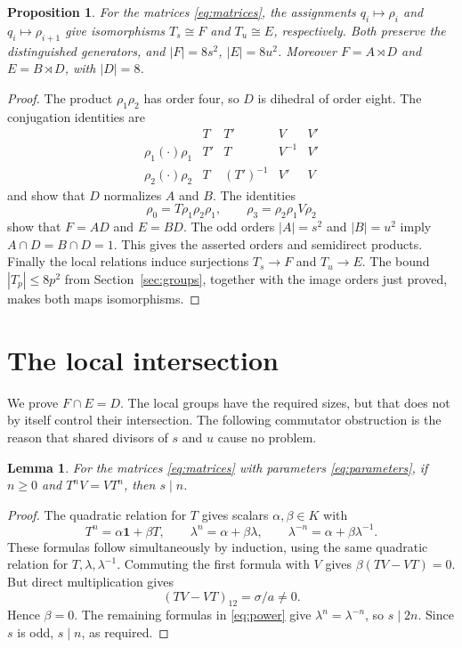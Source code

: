 \documentclass[11pt]{article}
\newtheorem{lemma}[theorem]{Lemma}
\newtheorem{proposition}[theorem]{Proposition}
\theoremstyle{definition}
\begin{document}
\begin{proposition}\label{prop:locals}
For the matrices \eqref{eq:matrices}, the assignments
$q_i\mapsto\rho_i$ and $q_i\mapsto\rho_{i+1}$ give isomorphisms
$T_s\cong F$ and $T_u\cong E$, respectively. Both preserve the
distinguished generators, and $|F|=8s^2$, $|E|=8u^2$.
Moreover $F=A\rtimes D$ and $E=B\rtimes D$, with $|D|=8$.
\end{proposition}
\begin{proof}
The product $\rho_1\rho_2$ has order four, so $D$ is dihedral of order
eight. The conjugation identities are
\begin{equation}\label{eq:conjugation}
\begin{array}{c|cccc}
 &T&T'&V&V'\\ \hline
 \rho_1(\cdot)\rho_1&T'&T&V^{-1}&V'\\
 \rho_2(\cdot)\rho_2&T&(T')^{-1}&V'&V
\end{array}
\end{equation}
and show that $D$ normalizes $A$ and $B$.
The identities
\[
              \rho_0=T\rho_1\rho_2\rho_1,\qquad
              \rho_3=\rho_2\rho_1V\rho_2
\]
show that $F=AD$ and $E=BD$.
The odd orders $|A|=s^2$ and $|B|=u^2$ imply $A\cap D=B\cap D=1$.
This gives the asserted orders and semidirect products.
Finally the local relations induce surjections $T_s\to F$ and
$T_u\to E$. The bound $|T_p|\leq8p^2$ from
Section~\ref{sec:groups}, together with the image orders just proved,
makes both maps isomorphisms.
\end{proof}

\section{The local intersection}\label{sec:intersection}
We prove $F\cap E=D$. The local groups have the required sizes, but
that does not by itself control their intersection. The following
commutator obstruction is the reason that shared divisors of $s$ and
$u$ cause no problem.

\begin{lemma}\label{lem:commutant}
For the matrices \eqref{eq:matrices} with parameters
\eqref{eq:parameters}, if $n\geq0$ and $T^nV=VT^n$, then $s\mid n$.
\end{lemma}
\begin{proof}
The quadratic relation for $T$ gives scalars $\alpha,\beta\in K$ with
\begin{equation}\label{eq:power}
 T^n=\alpha \mathbf 1+\beta T,\qquad
 \lambda^n=\alpha+\beta\lambda,\qquad
 \lambda^{-n}=\alpha+\beta\lambda^{-1}.
\end{equation}
These formulas follow simultaneously by induction, using
the same quadratic relation for $T,\lambda,\lambda^{-1}$.
Commuting the first formula with $V$ gives $\beta(TV-VT)=0$.
But direct multiplication gives
\begin{equation}\label{eq:commutator}
                         (TV-VT)_{12}=\sigma/a\ne0.
\end{equation}
Hence $\beta=0$. The remaining formulas in \eqref{eq:power} give
$\lambda^n=\lambda^{-n}$, so $s\mid2n$. Since $s$ is odd,
$s\mid n$, as required.
\end{proof}
\end{document}
